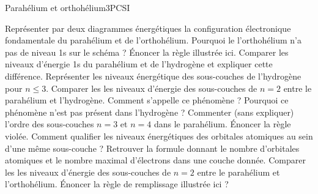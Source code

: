 \begin{exercise}{Parahélium et orthohélium}{3}{PCSI}
\begin{questions}
    \question Représenter par deux diagrammes énergétiques la configuration électronique fondamentale du parahélium et de l'orthohélium. Pourquoi le l'orthohélium n'a pas de niveau 1s sur le schéma ? \'Enoncer la règle illustrée ici.
    \question Comparer les niveaux d'énergie 1s du parahélium et de l'hydrogène et expliquer cette différence.
    \question Représenter les niveaux énergétique des sous-couches de l'hydrogène pour $n\leqslant 3$.
    \question Comparer les les niveaux d'énergie des sous-couches de $n=2$ entre le parahélium et l'hydrogène. Comment s'appelle ce phénomène ?
    \questionbonus Pourquoi ce phénomène n'est pas présent dans l'hydrogène ?
    \question Commenter (sans expliquer) l'ordre des sous-couches $n=3$ et $n=4$ dans le parahélium. \'Enoncer la règle violée.
    \question Comment qualifier les niveaux énergétiques des orbitales atomiques au sein d'une même sous-couche ?
    \question Retrouver la formule donnant le nombre d'orbitales atomiques et le nombre maximal d'électrons dans une couche donnée.
    \question Comparer les les niveaux d'énergie des sous-couches de $n=2$ entre le parahélium et l'orthohélium. \'Enoncer la règle de remplissage illustrée ici ?
    
\end{questions}
\end{exercise}